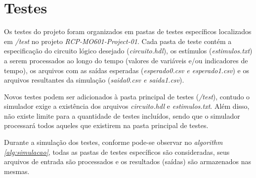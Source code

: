 
\section{Testes}

Os testes do projeto foram organizados em pastas de testes específicos localizados em \textit{/test} 
no projeto \textit{RCP-MO601-Project-01}. Cada pasta de teste contém a especificação do circuito 
lógico desejado (\textit{circuito.hdl}), os estímulos (\textit{estimulos.txt}) a serem processados ao 
longo do tempo (valores de variáveis e/ou indicadores de tempo), 
os arquivos com as saídas esperadas (\textit{esperado0.csv e esperado1.csv}) e os arquivos resultantes da simulação 
(\textit{saida0.csv e saida1.csv}).

Novos testes podem ser adicionados à pasta principal de testes (\textit{/test}), contudo o simulador exige a
existência dos arquivos \textit{circuito.hdl} e \textit{estimulos.txt}. Além disso, não existe limite para a quantidade 
de testes incluídos, sendo que o simulador processará todos aqueles que existirem na pasta principal de testes.

Durante a simulação dos testes, conforme pode-se observar no \textit{algorithm \ref{alg:simulacao}}, 
todas as pastas de testes específicos são consideradas, seus arquivos de entrada são 
processados e os resultados (saídas) são armazenados nas mesmas.